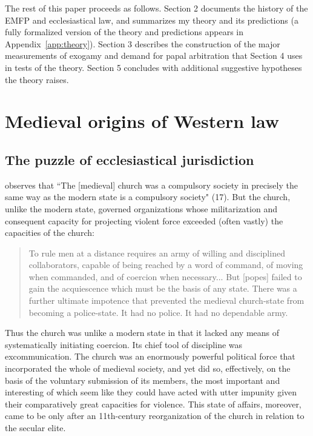 \documentclass[12pt]{article}
\theoremstyle{definition}
\theoremstyle{remark}
\begin{document}
The rest of this paper proceeds as follows. Section 2 documents the history of the EMFP and ecclesiastical law, and summarizes my theory and its predictions (a fully formalized version of the theory and predictions appears in Appendix~\ref{app:theory}). Section 3 describes the construction of the major measurements of exogamy and demand for papal arbitration that Section 4 uses in tests of the theory. Section 5 concludes with additional suggestive hypotheses the theory raises.



\section{Medieval origins of Western law}
\label{sec:history}

\subsection{The puzzle of ecclesiastical jurisdiction}

\citet{southern_1970} observes that ``The [medieval] church was a compulsory society in precisely the same way as the modern state is a compulsory society" (17). But the church, unlike the modern state, governed organizations whose militarization and consequent capacity for projecting violent force exceeded (often vastly) the capacities of the church:
\begin{quote}
To rule men at a distance requires an army of willing and disciplined collaborators, capable of being reached by a word of command, of moving when commanded, and of coercion when necessary... But [popes] failed to gain the acquiescence which must be the basis of any state. There was a further ultimate impotence that prevented the medieval church-state from becoming a police-state. It had no police. It had no dependable army. \citep[19]{southern_1970}
\end{quote}
Thus the church was unlike a modern state in that it lacked any means of systematically initiating coercion. Its chief tool of discipline was excommunication. The church was an enormously powerful political force that incorporated the whole of medieval society, and yet did so, effectively, on the basis of the voluntary submission of its members, the most important and interesting of which seem like they could have acted with utter impunity given their comparatively great capacities for violence. This state of affairs, moreover, came to be only after an 11th-century reorganization of the church in relation to the secular elite.
\end{document}
